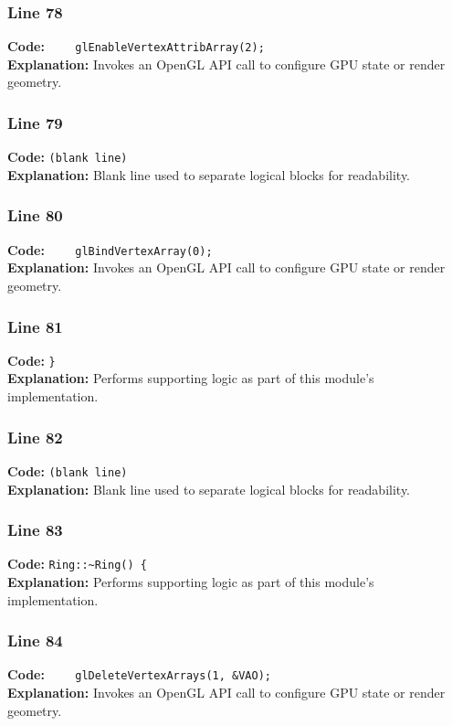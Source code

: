 \documentclass[11pt,a4paper]{article}
\begin{document}
\subsubsection*{Line 78}
\textbf{Code:} \verb|    glEnableVertexAttribArray(2);|\\
\textbf{Explanation:} Invokes an OpenGL API call to configure GPU state or render geometry.

\subsubsection*{Line 79}
\textbf{Code:} \texttt{(blank line)}\\
\textbf{Explanation:} Blank line used to separate logical blocks for readability.

\subsubsection*{Line 80}
\textbf{Code:} \verb|    glBindVertexArray(0);|\\
\textbf{Explanation:} Invokes an OpenGL API call to configure GPU state or render geometry.

\subsubsection*{Line 81}
\textbf{Code:} \verb|}|\\
\textbf{Explanation:} Performs supporting logic as part of this module's implementation.

\subsubsection*{Line 82}
\textbf{Code:} \texttt{(blank line)}\\
\textbf{Explanation:} Blank line used to separate logical blocks for readability.

\subsubsection*{Line 83}
\textbf{Code:} \verb|Ring::~Ring() {|\\
\textbf{Explanation:} Performs supporting logic as part of this module's implementation.

\subsubsection*{Line 84}
\textbf{Code:} \verb|    glDeleteVertexArrays(1, &VAO);|\\
\textbf{Explanation:} Invokes an OpenGL API call to configure GPU state or render geometry.
\end{document}
